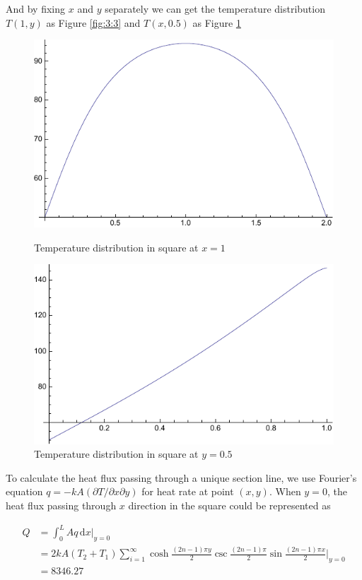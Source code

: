 \begin{solution}
And by fixing $x$ and $y$ separately we can get the temperature distribution $T(1,y)$ as Figure \ref{fig:3:3} and $T(x,0.5)$ as Figure \ref{fig:3:4}
\begin{figure}[h!]
  \begin{minipage}[b]{0.45\linewidth}
  \centering
    \includegraphics[scale=0.7]{figures/ch3/3}
    \caption{Temperature distribution in square at $x=1$}
    \label{fig:3:3}
\end{minipage}
\hspace{0.5cm}
\begin{minipage}[b]{0.45\linewidth}
  \centering
    \includegraphics[scale=0.7]{figures/ch3/4}
    \caption{Temperature distribution in square at $y=0.5$}
    \label{fig:3:4}
\end{minipage}
\end{figure}
To calculate the heat flux passing through a unique section line, we use Fourier's equation $q=-kA(\partial T/\partial x\partial y)$ for heat rate at point $(x, y)$. When $y=0$, the heat flux passing through $x$ direction in the square could be represented as

\begin{equation*}
\begin{aligned}
Q&=\int_0^L \! Aq \, \mathrm{d} x|_{y=0} \\
&=2kA(T_2+T_1)\sum\limits_{i=1}^\infty 
\cosh{\frac{(2n-1)\pi y}{2}}\csc{\frac{(2n-1)\pi}{2}}\sin{\frac{(2n-1)\pi x}{2}}|_{y=0}
\\&=8346.27
\end{aligned}
\end{equation*}


\end{solution}




